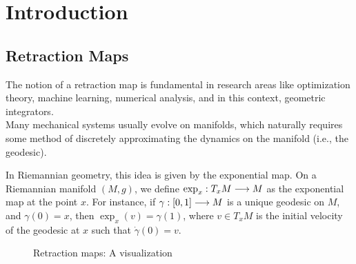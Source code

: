 % 
\chapter{Introduction} %
\label{chap:intro} %


%
\section{Retraction Maps} 
\label{sec:retr-intro} %

The notion of a retraction map is fundamental in research areas like optimization theory, machine learning, numerical analysis, and in this context, geometric integrators. \\ Many mechanical systems usually evolve on manifolds, which naturally requires some method of discretely approximating the dynamics on the manifold (i.e., the geodesic). 

In Riemannian geometry, this idea is given by the exponential map. On a Riemannian manifold $(M, g)$, we define $\exp_x: T_x M \longrightarrow M$ as the exponential map at the point $x$. For instance, if  $\gamma: [0, 1] \longrightarrow M$ is a unique geodesic on $M$, and $\gamma(0) = x$, then $\exp_x(v) = \gamma(1)$, where $v \in T_x M$ is the initial velocity of the geodesic at $x$ such that $\dot{\gamma}(0) = v$.

    \begin{figure}[h]
        \centering
        \caption{Retraction maps: A visualization}
            \label{fig:retraction}
        \end{figure}


